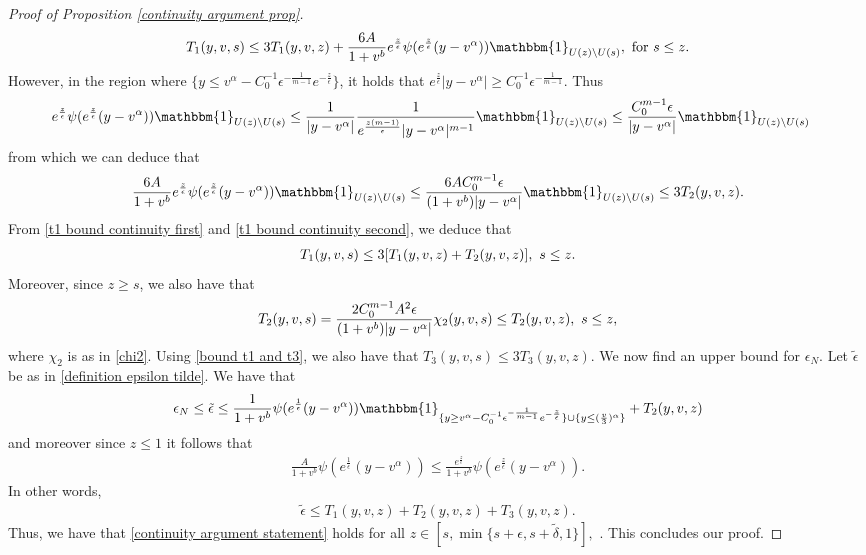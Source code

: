 \documentclass[11pt]{article}
\numberwithin{equation}{section}
\begin{document}
\begin{proof}[Proof of Proposition \ref{continuity argument prop}]
\begin{align}
  T_{1}(y,v,s)\leq  3T_{1}(y,v,z)+\frac{6A }{1+v^{b}}e^{\frac{z}{\epsilon}}\psi(e^{\frac{z}{\epsilon}}(y-v^{\alpha}))\mathbbm{1}_{U(z)\setminus U(s)}, \textup{ for } s\leq z.
\end{align}
However, in the region where $  \{y\leq v^{\alpha}-C_{0}^{-1}\epsilon^{-\frac{1}{m-1}}  e^{-\frac{z}{\epsilon}}\}$, it holds that $e^{\frac{z}{\epsilon}}|y-v^{\alpha}|\geq C_{0}^{-1}\epsilon^{-\frac{1}{m-1}}$. Thus
\begin{align*}
    e^{\frac{z}{\epsilon}}\psi(e^{\frac{z}{\epsilon}}(y-v^{\alpha}))\mathbbm{1}_{U(z)\setminus U(s)}&\leq \frac{1}{|y-v^{\alpha}|}\frac{1}{e^{\frac{z(m-1)}{\epsilon}}|y-v^{\alpha}|^{m-1}}\mathbbm{1}_{U(z)\setminus U(s)}\leq  \frac{C_{0}^{m-1}\epsilon}{|y-v^{\alpha}|}\mathbbm{1}_{U(z)\setminus U(s)}
\end{align*}
from which we can deduce that 
\begin{align}\label{t1 bound continuity second}
\frac{6A }{1+v^{b}}e^{\frac{z}{\epsilon}}\psi(e^{\frac{z}{\epsilon}}(y-v^{\alpha}))\mathbbm{1}_{U(z)\setminus U(s)}\leq  \frac{6A C_{0}^{m-1}\epsilon}{(1+v^{b})|y-v^{\alpha}|}\mathbbm{1}_{U(z)\setminus U(s)}\leq 3T_{2}(y,v,z).
\end{align}
From \eqref{t1 bound continuity first} and \eqref{t1 bound continuity second}, we deduce that
\begin{align*}
  T_{1}(y,v,s)\leq  3[T_{1}(y,v,z)+T_{2}(y,v,z)],\textup{ } s\leq z.
\end{align*}
Moreover, since $z\geq s$, we also have that
\begin{align*}
T_{2}(y,v,s)=\frac{2 C_{0}^{m-1}A^{2} \epsilon}{(1+v^{b})|y-v^{\alpha}|}\chi_{2}(y,v,s)\leq T_{2}(y,v,z), \textup{ } s\leq z,
\end{align*}
where $\chi_{2}$ is as in \eqref{chi2}. Using \eqref{bound t1 and t3}, we also have that $T_{3}(y,v,s)\leq 3 T_{3}(y,v,z)$. We now find an upper bound for $\epsilon_{N}$. Let $\tilde{\epsilon}$ be as in \eqref{definition epsilon tilde}. We have that
\begin{align*}
\epsilon_{N}\leq \tilde{\epsilon}\leq \frac{1}{1+v^{b}}\psi(e^{\frac{1}{\epsilon}}(y-v^{\alpha}))\mathbbm{1}_{ \{y\geq v^{\alpha}-C_{0}^{-1}\epsilon^{-\frac{1}{m-1}}  e^{-\frac{z}{\epsilon}}\}\cup\{y\leq (\frac{v}{3})^{\alpha}\}}+T_{2}(y,v,z)
\end{align*}
and moreover since $z\leq 1$ it follows that
\begin{align*}
\frac{A}{1+v^{b}}\psi(e^{\frac{1}{\epsilon}}(y-v^{\alpha}))\leq \frac{e^{\frac{z}{\epsilon}}}{1+v^{b}}\psi(e^{\frac{z}{\epsilon}}(y-v^{\alpha})).
\end{align*}
In other words,
\begin{align*}
    \tilde{\epsilon}\leq T_{1}(y,v,z)+T_{2}(y,v,z)+T_{3}(y,v,z).
\end{align*}
Thus, we have that \eqref{continuity argument statement} holds for all $z\in[s,\min\{s+\epsilon,s+\tilde{\delta},1\}],$  . This concludes our proof.
\end{proof}
\end{document}
